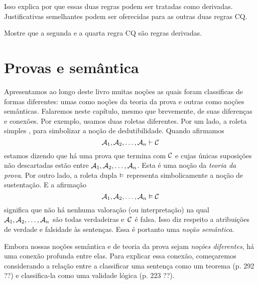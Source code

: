 \begin{fitchproof}
	\open
		\open
		\close
	\close
\end{fitchproof}
Isso explica por que essas duas regras podem ser tratadas como derivadas.  Justificativas semelhantes podem ser oferecidas para as outras duas regras CQ.

\practiceproblems

\problempart
Mostre que a segunda e a quarta regra  CQ são regras derivadas.


\chapter{Provas e semântica}

 Apresentamos ao longo deste livro muitas noções as quais foram classificas de formas diferentes: umas como noções da teoria da prova e outras como  noções semânticas.  Falaremos neste capítulo, mesmo que brevemente, de suas diferenças  e conexões. 
Por exemplo, usamos duas roletas diferentes.  Por um lado, a roleta simples  \proves,  para simbolizar a noção de dedutibilidade. Quando afirmamos 
$$\mathcal{A}_1, \mathcal{A}_2, \ldots, \mathcal{A}_n \vdash \mathcal{C}$$
estamos dizendo que há uma prova que termina com $\mathcal{C}$ e cujas únicas suposições não descartadas estão entre  $\mathcal{A}_1, \mathcal{A}_2, \ldots, \mathcal{A}_n$. Esta é uma noção da \emph{teoria da prova}.   Por outro lado,  a roleta  dupla  $\vDash$  representa simbolicamente a noção de sustentação. E a afirmação 
$$\mathcal{A}_1, \mathcal{A}_2, \ldots, \mathcal{A}_n \vDash \mathcal{C}$$
significa que não há nenhuma valoração (ou interpretação) na qual  $\mathcal{A}_1, \mathcal{A}_2, \ldots, \mathcal{A}_n$ são todas verdadeiras e~$\mathcal{C}$ é falsa. Isso diz respeito a atribuições de verdade e falsidade às sentenças. Essa é portanto uma \emph{noção semântica}.

Embora nossas noções semântica e de teoria da prova sejam \emph{noções diferentes}, há uma conexão profunda entre elas. Para explicar essa conexão, começaremos considerando a relação entre a classificar uma sentença como um teorema (p. 292  ??) e classifica-la como uma validade lógica (p. 223 ??).

